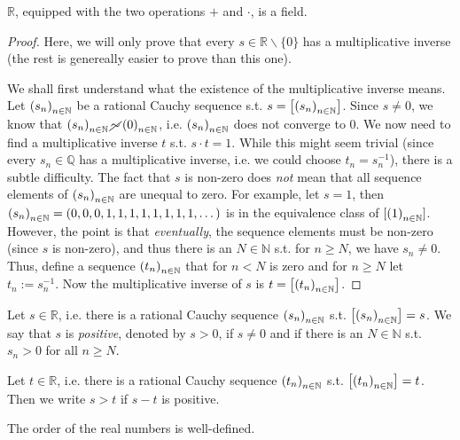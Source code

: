\begin{theorem}
	$\mathbb R$, equipped with the two operations $+$ and $\cdot$, is a field.
\end{theorem}

\begin{proof}
	Here, we will only prove that every $s\in\mathbb R\backslash \{0\}$ has a multiplicative inverse (the rest is genereally easier to prove than this one).
	
	We shall first understand what the existence of the multiplicative inverse means. Let $\seq[s_n]$ be a rational Cauchy sequence s.t. $s = \left[\seq[s_n]\right]$. Since $s\ne 0$, we know that $\seq[s_n]\cancel{\sim}\seq[0]$, i.e. $\seq[s_n]$ does not converge to $0$. We now need to find a multiplicative inverse $t$ s.t. $s \cdot t = 1$. While this might seem trivial (since every $s_n\in\mathbb Q$ has a multiplicative inverse, i.e. we could choose $t_n = s_n^{-1}$), there is a subtle difficulty. The fact that $s$ is non-zero does \textit{not} mean that all sequence elements of $\seq[s_n]$ are unequal to zero. For example, let $s = 1$, then $\seq[s_n] = \left(0, 0, 0, 1, 1, 1, 1, 1, 1, 1, 1, \dots\right)$ is in the equivalence class of $[\seq[1]]$. However, the point is that \textit{eventually}, the sequence elements must be non-zero (since $s$ is non-zero), and thus there is an $N\in\mathbb N$ s.t. for $n\geq N$, we have $s_n\ne 0$. Thus, define a sequence $\seq[t_n]$ that for $n < N$ is zero and for $n\geq N$ let $t_n := s_n^{-1}$. Now the multiplicative inverse of $s$ is $t = \left[\seq[t_n]\right]$.
\end{proof}

\begin{defn}\label{defn:order_R}
	Let $s\in\mathbb R$, i.e. there is a rational Cauchy sequence $\seq[s_n]$ s.t. $\left[\seq[s_n]\right] = s$. We say that $s$ is \textit{positive}, denoted by $s > 0$, if $s\ne 0$ and if there is an $N\in\mathbb N$ s.t. $s_n > 0$ for all $n\geq N$.
	
	Let $t\in\mathbb R$, i.e. there is a rational Cauchy sequence $\seq[t_n]$ s.t. $\left[\seq[t_n]\right] = t$. Then we write $s > t$ if $s - t$ is positive.
\end{defn}

\begin{theorem}
	The order of the real numbers is well-defined.
\end{theorem}

